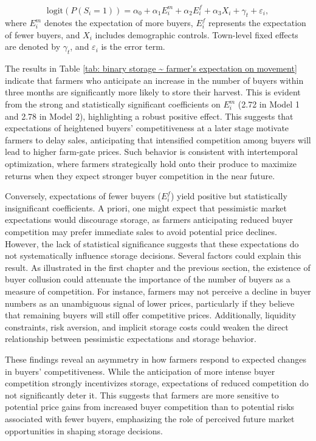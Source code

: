 \documentclass[12pt]{article}
\begin{document}
\begin{equation}
    \text{logit} \left( P(S_i = 1) \right) = \alpha_0 + \alpha_1 E^m_i + \alpha_2 E^f_i + \alpha_3 X_i + \gamma_t + \varepsilon_i,
\end{equation}
where $E^m_i$ denotes the expectation of more buyers, $E^f_i$ represents the expectation of fewer buyers, and $X_i$ includes demographic controls. Town-level fixed effects are denoted by $\gamma_t$, and $\varepsilon_i$ is the error term.



The results in Table \ref{tab: binary storage ~ farmer's expectation on movement} indicate that farmers who anticipate an increase in the number of buyers within three months are significantly more likely to store their harvest. This is evident from the strong and statistically significant coefficients on $E^m_i$ (2.72 in Model 1 and 2.78 in Model 2), highlighting a robust positive effect. This suggests that expectations of heightened buyers' competitiveness at a later stage motivate farmers to delay sales, anticipating that intensified competition among buyers will lead to higher farm-gate prices. Such behavior is consistent with intertemporal optimization, where farmers strategically hold onto their produce to maximize returns when they expect stronger buyer competition in the near future.  

Conversely, expectations of fewer buyers ($E^f_i$) yield positive but statistically insignificant coefficients. A priori, one might expect that pessimistic market expectations would discourage storage, as farmers anticipating reduced buyer competition may prefer immediate sales to avoid potential price declines. However, the lack of statistical significance suggests that these expectations do not systematically influence storage decisions. Several factors could explain this result. As illustrated in the first chapter and the previous section, the existence of buyer collusion could attenuate the importance of the number of buyers as a measure of competition. For instance, farmers may not perceive a decline in buyer numbers as an unambiguous signal of lower prices, particularly if they believe that remaining buyers will still offer competitive prices. Additionally, liquidity constraints, risk aversion, and implicit storage costs could weaken the direct relationship between pessimistic expectations and storage behavior.  

These findings reveal an asymmetry in how farmers respond to expected changes in buyers' competitiveness. While the anticipation of more intense buyer competition strongly incentivizes storage, expectations of reduced competition do not significantly deter it. This suggests that farmers are more sensitive to potential price gains from increased buyer competition than to potential risks associated with fewer buyers, emphasizing the role of perceived future market opportunities in shaping storage decisions.
\end{document}
